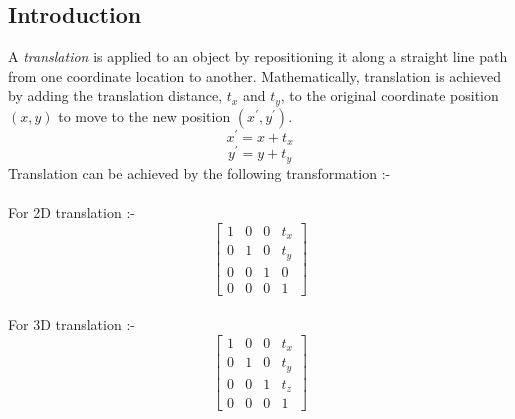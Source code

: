 \documentclass[a4paper,12pt,titlepage,twosided]{article}
\begin{document}
	\subsection{Introduction}
	A \emph{translation} is applied to an object by repositioning it along a straight line path from one coordinate location to another. Mathematically, translation is achieved by adding the translation distance, $t_x$ and $t_y$, to the original coordinate position $(x,y)$ to move to the new position $(x^{'},y^{'})$.
	\begin{equation*}
		x^{'} = x + t_x
	\end{equation*}
	\begin{equation*}
		y^{'} = y + t_y
	\end{equation*}
	Translation can be achieved by the following transformation :-\\
	\\
	For 2D translation :-
	\begin {equation*}
		\begin{bmatrix}
			1 & 0 & 0 & t_x \\
			0 & 1 & 0 & t_y \\
			0 & 0 & 1 & 0 \\
			0 & 0 & 0 & 1
		\end{bmatrix}
	\end{equation*}
	\\
	For 3D translation :-
	\begin {equation}
		\begin{bmatrix}
			1 & 0 & 0 & t_x \\
			0 & 1 & 0 & t_y \\
			0 & 0 & 1 & t_z \\
			0 & 0 & 0 & 1
			\label{translation_eq}
		\end{bmatrix}
	\end{equation}
		
\end{document}

